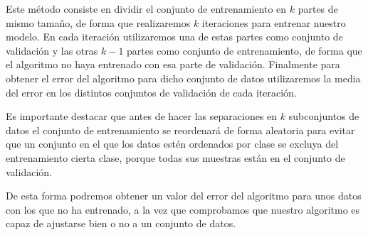 Este método consiste en dividir el conjunto de entrenamiento en $k$ partes de mismo tamaño, de forma que realizaremos $k$ iteraciones para entrenar nuestro modelo. En cada iteración utilizaremos una de estas partes como conjunto de validación y las otras $k - 1$ partes como conjunto de entrenamiento, de forma que el algoritmo no haya entrenado con esa parte de validación. Finalmente para obtener el error del algoritmo para dicho conjunto de datos utilizaremos la media del error en los distintos conjuntos de validación de cada iteración.

Es importante destacar que antes de hacer las separaciones en $k$ subconjuntos de datos el conjunto de entrenamiento se reordenará de forma aleatoria para evitar que un conjunto en el que los datos estén ordenados por clase se excluya del entrenamiento cierta clase, porque todas sus muestras están en el conjunto de validación.

De esta forma podremos obtener un valor del error del algoritmo para unos datos con los que no ha entrenado, a la vez que comprobamos que nuestro algoritmo es capaz de ajustarse bien o no a un conjunto de datos.


